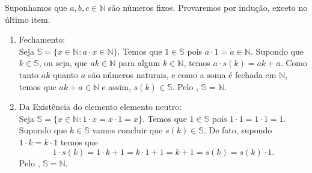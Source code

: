 \documentclass[../main.tex]{subfiles}
\begin{document}
\begin{dem}
    Suponhamos que $a,b,c \in \mathbb{N}$ são números fixos. Provaremos por indução, exceto no último item.
    \begin{enumerate}[label=(\roman*)]
        \item Fechamento: \\
            Seja $\mathbb{S} = \{x \in \mathbb{N} : a \cdot x \in \mathbb{N} \}$.
            Temos que $1 \in \mathbb{S}$ pois $a \cdot 1 = a \in \mathbb{N}$. Supondo que $k \in \mathbb{S}$, ou seja, que $ak \in \mathbb{N}$ para algum $k \in \mathbb{N}$, temos $a \cdot s(k) = ak + a$. Como tanto $ak$ quanto $a$ são números naturais, e como a soma é fechada em $\mathbb{N}$, temos que $ak + a \in \mathbb{N}$ e assim, $s(k) \in \mathbb{S}$. Pelo , $\mathbb{S}$ = $\mathbb{N}$. 
        \item Da Existência do elemento elemento neutro: \\
            Seja $\mathbb{S} = \{ x \in \mathbb{N} : 1 \cdot x = x \cdot 1  = x \}$. Temos que $1 \in \mathbb{S}$ pois $1 \cdot 1 = 1 \cdot 1 = 1$. Supondo que $k \in \mathbb{S}$ vamos concluir que $s(k) \in \mathbb{S}$.
            De fato, supondo $1 \cdot k = k \cdot 1$ temos que
            \[ 1 \cdot s(k) = 1 \cdot k + 1 = k \cdot 1 + 1 = k + 1 = s(k) = s(k) \cdot 1. \] 
            Pelo , $\mathbb{S} = \mathbb{N}$.
            

\end{enumerate}
\end{dem}
\end{document}
